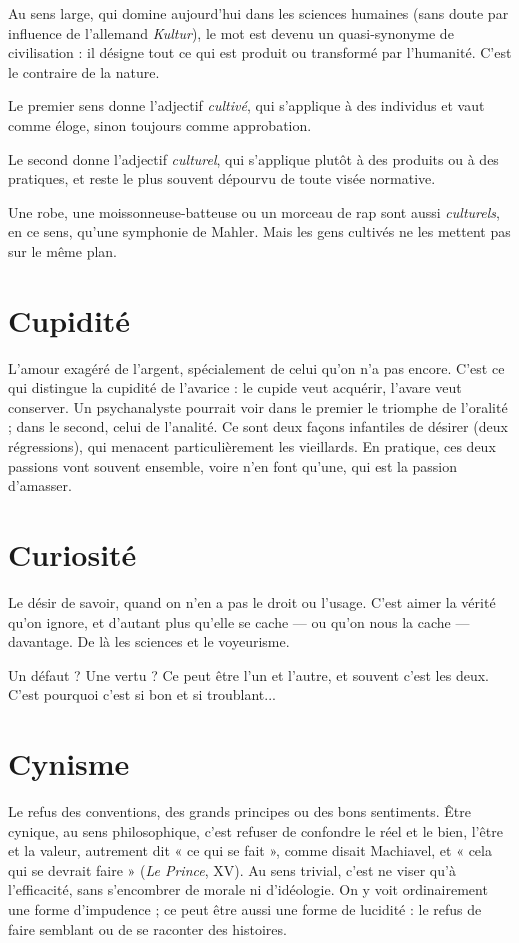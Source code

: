 Au sens large, qui domine aujourd’hui dans les sciences humaines (sans
doute par influence de l'allemand {\it Kultur}), le mot est devenu un quasi-synonyme
de civilisation : il désigne tout ce qui est produit ou transformé par
l’humanité. C’est le contraire de la nature.

Le premier sens donne l'adjectif {\it cultivé}, qui s'applique à des individus et
vaut comme éloge, sinon toujours comme approbation.

Le second donne l’adjectif {\it culturel}, qui s'applique plutôt à des produits ou
à des pratiques, et reste le plus souvent dépourvu de toute visée normative.

Une robe, une moissonneuse-batteuse ou un morceau de rap sont aussi {\it culturels},
en ce sens, qu’une symphonie de Mahler. Mais les gens cultivés ne les
mettent pas sur le même plan.

\section{Cupidité}
L'amour exagéré de l’argent, spécialement de celui qu’on n’a
pas encore. C’est ce qui distingue la cupidité de l’avarice : le
cupide veut acquérir, l’avare veut conserver. Un psychanalyste pourrait voir
dans le premier le triomphe de l’oralité ; dans le second, celui de l’analité. Ce
sont deux façons infantiles de désirer (deux régressions), qui menacent
particulièrement les vieillards.
En pratique, ces deux passions vont souvent ensemble, voire n’en font
qu’une, qui est la passion d’amasser.

\section{Curiosité}
Le désir de savoir, quand on n’en a pas le droit ou l’usage.
C’est aimer la vérité qu’on ignore, et d’autant plus qu’elle se
cache — ou qu’on nous la cache — davantage. De là les sciences et le voyeurisme.

Un défaut ? Une vertu ? Ce peut être l’un et l’autre, et souvent c’est les
deux. C’est pourquoi c’est si bon et si troublant...

\section{Cynisme}
Le refus des conventions, des grands principes ou des bons sentiments.
Être cynique, au sens philosophique, c’est refuser de
confondre le réel et le bien, l'être et la valeur, autrement dit « ce qui se fait »,
comme disait Machiavel, et « cela qui se devrait faire » ({\it Le Prince}, XV). Au sens
trivial, c’est ne viser qu’à l'efficacité, sans s’encombrer de morale ni d’idéologie.
On y voit ordinairement une forme d’impudence ; ce peut être aussi une forme
de lucidité : le refus de faire semblant ou de se raconter des histoires.

